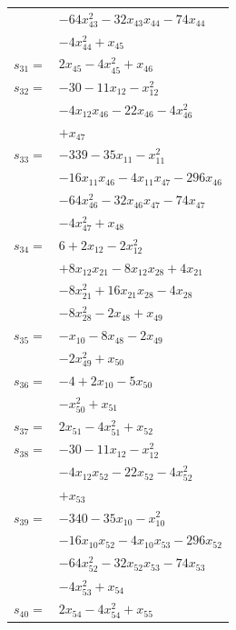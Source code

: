 \begin{longtable}{@{}r@{\;}l@{}}
 & \(\displaystyle -64x_{43}^{2} -32x_{43}x_{44} -74x_{44}\) \\
 & \(\displaystyle -4x_{44}^{2} +x_{45}\) \\[3pt]
\(s_{31}=\) & \(\displaystyle 2x_{45} -4x_{45}^{2} +x_{46}\) \\[3pt]
\(s_{32}=\) & \(\displaystyle -30 -11x_{12} -x_{12}^{2}\) \\
 & \(\displaystyle -4x_{12}x_{46} -22x_{46} -4x_{46}^{2}\) \\
 & \(\displaystyle +x_{47}\) \\[3pt]
\(s_{33}=\) & \(\displaystyle -339 -35x_{11} -x_{11}^{2}\) \\
 & \(\displaystyle -16x_{11}x_{46} -4x_{11}x_{47} -296x_{46}\) \\
 & \(\displaystyle -64x_{46}^{2} -32x_{46}x_{47} -74x_{47}\) \\
 & \(\displaystyle -4x_{47}^{2} +x_{48}\) \\[3pt]
\(s_{34}=\) & \(\displaystyle 6 +2x_{12} -2x_{12}^{2}\) \\
 & \(\displaystyle +8x_{12}x_{21} -8x_{12}x_{28} +4x_{21}\) \\
 & \(\displaystyle -8x_{21}^{2} +16x_{21}x_{28} -4x_{28}\) \\
 & \(\displaystyle -8x_{28}^{2} -2x_{48} +x_{49}\) \\[3pt]
\(s_{35}=\) & \(\displaystyle -x_{10} -8x_{48} -2x_{49}\) \\
 & \(\displaystyle -2x_{49}^{2} +x_{50}\) \\[3pt]
\(s_{36}=\) & \(\displaystyle -4 +2x_{10} -5x_{50}\) \\
 & \(\displaystyle -x_{50}^{2} +x_{51}\) \\[3pt]
\(s_{37}=\) & \(\displaystyle 2x_{51} -4x_{51}^{2} +x_{52}\) \\[3pt]
\(s_{38}=\) & \(\displaystyle -30 -11x_{12} -x_{12}^{2}\) \\
 & \(\displaystyle -4x_{12}x_{52} -22x_{52} -4x_{52}^{2}\) \\
 & \(\displaystyle +x_{53}\) \\[3pt]
\(s_{39}=\) & \(\displaystyle -340 -35x_{10} -x_{10}^{2}\) \\
 & \(\displaystyle -16x_{10}x_{52} -4x_{10}x_{53} -296x_{52}\) \\
 & \(\displaystyle -64x_{52}^{2} -32x_{52}x_{53} -74x_{53}\) \\
 & \(\displaystyle -4x_{53}^{2} +x_{54}\) \\[3pt]
\(s_{40}=\) & \(\displaystyle 2x_{54} -4x_{54}^{2} +x_{55}\) \\[3pt]

\end{longtable}
